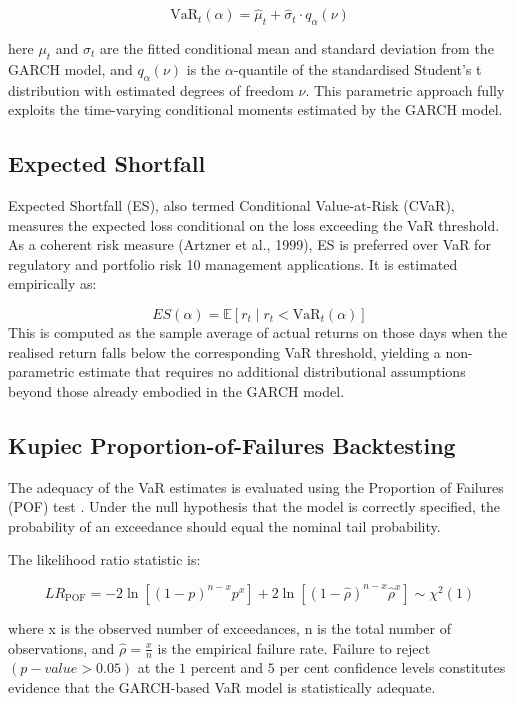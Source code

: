 \begin{equation}
\mathrm{VaR}_t(\alpha)
=
\hat{\mu}_t
+
\hat{\sigma}_t \cdot q_{\alpha}(\nu)
\end{equation}

here $\mu_t$ and $\sigma_t$ are the fitted conditional mean and standard deviation from the GARCH
model, and $q_{\alpha}(\nu)$ is the $\alpha$-quantile of the standardised Student’s t distribution with
estimated degrees of freedom $\nu$. This parametric approach fully exploits the time-varying
conditional moments estimated by the GARCH model.

\subsection{Expected Shortfall}
Expected Shortfall (ES), also termed Conditional Value-at-Risk (CVaR), measures the expected loss conditional on the loss exceeding the VaR threshold. As a coherent risk measure (Artzner et al., 1999), ES is preferred over VaR for regulatory and portfolio risk 10 management applications. It is estimated empirically as:

\begin{equation}
ES(\alpha)
=
\mathbb{E}
\left[
r_t \mid r_t < \mathrm{VaR}_t(\alpha)
\right]
\end{equation}
This is computed as the sample average of actual returns on those days when the realised return falls below the corresponding VaR threshold, yielding a non-parametric estimate that requires no additional distributional assumptions beyond those already embodied in
the GARCH model.

\subsection{Kupiec Proportion-of-Failures Backtesting}
The adequacy of the VaR estimates is evaluated using the  Proportion of Failures (POF) test \citep{kupiec1995}. Under the null hypothesis that the model is correctly specified, the probability of an exceedance should equal the nominal tail probability.

The likelihood ratio statistic is:

\begin{equation}
LR_{\mathrm{POF}}
=
-2 \ln \left[(1-p)^{n-x} p^x \right]
+
2 \ln \left[(1-\hat{\rho})^{n-x} \hat{\rho}^x \right]
\sim \chi^2(1)
\end{equation}

where x is the observed number of exceedances, n is the total number of observations, and $\hat{\rho} = \frac{x}{n}$ is the empirical failure rate. Failure to reject $(p-value > 0.05)$ at the $1$ percent and $5$ per cent confidence levels constitutes evidence that the GARCH-based VaR
model is statistically adequate.

